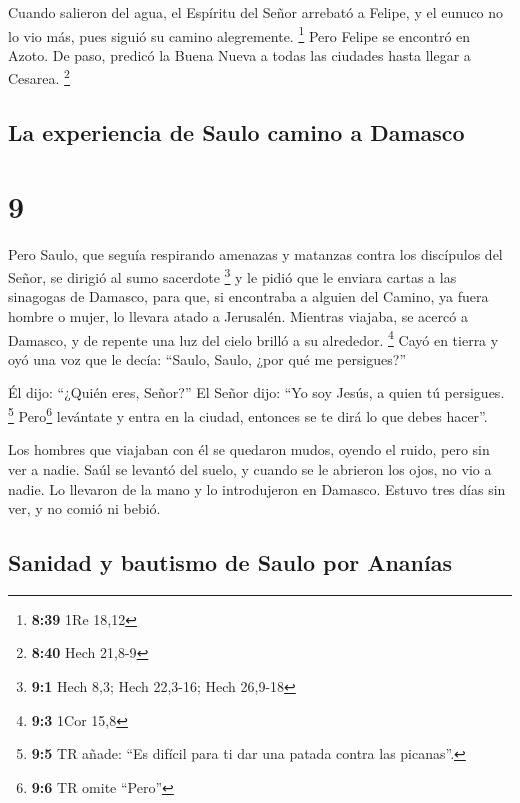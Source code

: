  Cuando salieron del agua, el Espíritu del Señor arrebató
a Felipe, y el eunuco no lo vio más, pues siguió su camino alegremente.
\footnote{\textbf{8:39} 1Re 18,12}  Pero Felipe se
encontró en Azoto. De paso, predicó la Buena Nueva a todas las ciudades
hasta llegar a Cesarea. \footnote{\textbf{8:40} Hech 21,8-9}

\hypertarget{la-experiencia-de-saulo-camino-a-damasco}{%
\subsection{La experiencia de Saulo camino a
Damasco}\label{la-experiencia-de-saulo-camino-a-damasco}}

\hypertarget{section-8}{%
\section{9}\label{section-8}}

 Pero Saulo, que seguía respirando amenazas y matanzas
contra los discípulos del Señor, se dirigió al sumo sacerdote
\footnote{\textbf{9:1} Hech 8,3; Hech 22,3-16; Hech 26,9-18}
 y le pidió que le enviara cartas a las sinagogas de
Damasco, para que, si encontraba a alguien del Camino, ya fuera hombre o
mujer, lo llevara atado a Jerusalén.  Mientras viajaba, se
acercó a Damasco, y de repente una luz del cielo brilló a su alrededor.
\footnote{\textbf{9:3} 1Cor 15,8}  Cayó en tierra y oyó
una voz que le decía: ``Saulo, Saulo, ¿por qué me persigues?''

 Él dijo: ``¿Quién eres, Señor?'' El Señor dijo: ``Yo soy
Jesús, a quien tú persigues. \footnote{\textbf{9:5} TR añade: ``Es
  difícil para ti dar una patada contra las picanas''.} 
Pero\footnote{\textbf{9:6} TR omite ``Pero''} levántate y entra en la
ciudad, entonces se te dirá lo que debes hacer''.

 Los hombres que viajaban con él se quedaron mudos, oyendo
el ruido, pero sin ver a nadie.  Saúl se levantó del
suelo, y cuando se le abrieron los ojos, no vio a nadie. Lo llevaron de
la mano y lo introdujeron en Damasco.  Estuvo tres días
sin ver, y no comió ni bebió.

\hypertarget{sanidad-y-bautismo-de-saulo-por-ananuxedas}{%
\subsection{Sanidad y bautismo de Saulo por
Ananías}\label{sanidad-y-bautismo-de-saulo-por-ananuxedas}}

